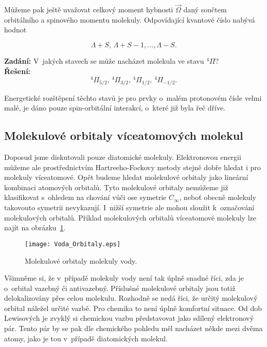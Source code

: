 Můžeme pak ještě uvažovat celkový moment hybnosti $\vec{\Omega}$ daný součtem orbitálního a spinového momentu molekuly. Odpovídající kvantové číslo nabývá hodnot

\begin{equation}
\Lambda + S, \, \Lambda + S - 1, \dots, \Lambda - S. 
\label{rov:ElStrukt-25}
\end{equation}

\begin{priklad}
\textbf{Zadání:} V~jakých stavech se může nacházet molekula ve stavu $^4\Pi$?\\[0.1cm]
\textbf{Řešení:}
\begin{displaymath}
^4\Pi_{5/2}, \, ^4\Pi_{3/2}, \, ^4\Pi_{1/2}, \, ^4\Pi_{-1/2}.
\end{displaymath} \vspace{-0.7cm}
\end{priklad}

Energetické rozštěpení těchto stavů je pro prvky o~malém protonovém čísle velmi malé, je dáno pouze spin-orbitální interakcí, o~které již byla řeč dříve. 


\subsection{Molekulové orbitaly víceatomových molekul}
Doposud jsme diskutovali pouze diatomické molekuly. Elektronovou energii můžeme ale prostřednictvím Hartreeho-Fockovy metody stejně dobře hledat i pro molekuly víceatomové. Opět budeme hledat molekulové orbitaly jako lineární kombinaci atomových orbitalů. Tyto molekulové orbitaly nemůžeme již klasifikovat s~ohledem na chování vůči ose symetrie $C_\infty$, neboť obecně molekuly takovouto symetrii nevykazují. I~nižší symetrie ale mohou sloužit k~označování molekulových orbitalů. Příklad molekulových orbitalů víceatomové molekuly lze najít na obrázku~\ref{obr:Voda_Orbitaly}.

\begin{figure} [htb]
\centering
\texttt{[image: Voda\_Orbitaly.eps]}
\caption{Molekulové orbitaly molekuly vody.}
\label{obr:Voda_Orbitaly}
\end{figure}

 
Všimněme si, že v~případě molekuly vody není tak úplně snadné říci, zda je o~orbital vazebný či antivazebný. Příslušné molekulové orbitaly jsou totiž delokalizovány přes celou molekulu. Rozhodně se nedá říci, že určitý molekulový orbital náležel určité vazbě. Pro chemika to není úplně komfortní situace. Od dob Lewisových je zvyklý si chemickou vazbu představovat jako sdílený elektronový pár. Tento pár by se pak dle chemického pohledu měl nacházet někde mezi dvěma atomy, jako je tou v~případě diatomických molekul. 

